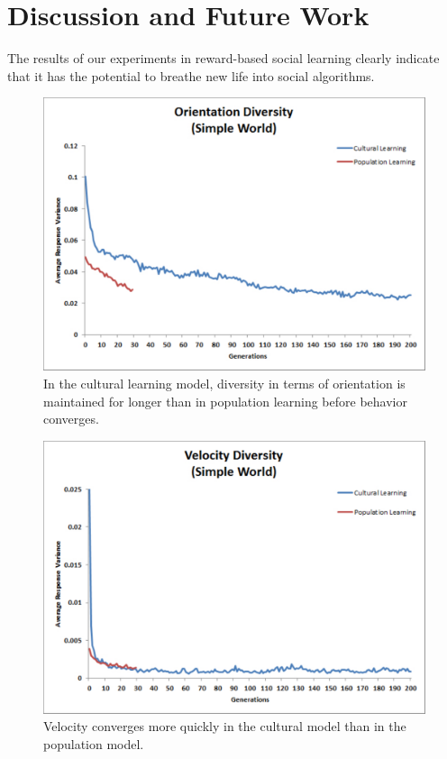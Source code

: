 \documentclass{acm_proc_article-sp}
\begin{document}
\section{Discussion and Future Work}
\label{sec:future}
The results of our experiments in reward-based social learning clearly indicate that it has the potential to breathe new life into social algorithms. 


\begin{figure}
  \centering
    \includegraphics[scale=.35]{orientation_diversity.pdf}
  \caption{In the cultural learning model, diversity in terms of orientation is maintained for longer than in population learning before behavior converges.}
  \label{fig:orientation}
\end{figure}

\begin{figure}
  \centering
    \includegraphics[scale=.35]{velocity_diversity.pdf}
  \caption{Velocity converges more quickly in the cultural model than in the population model.}
  \label{fig:velocity}
\end{figure}
\end{document}
